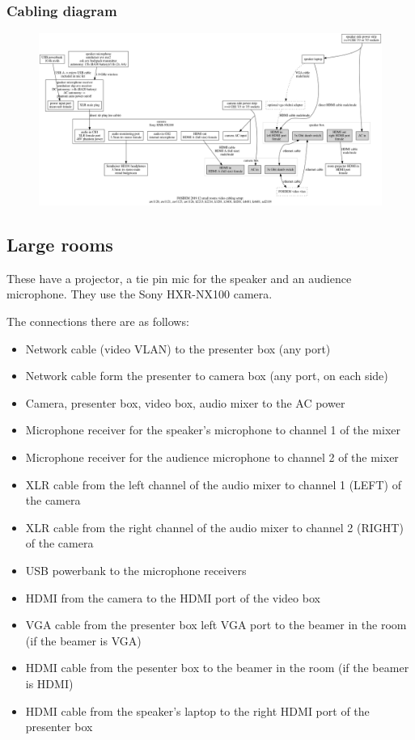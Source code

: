 \documentclass{article}
\begin{document}
\subsubsection{Cabling diagram}
\begin{figure}[H]
  \begin{sideways}
  \centering
  \includegraphics[width = 200mm]{../../graph/cabling_small_rooms.png}
  \end{sideways}
\end{figure}

\subsection{Large rooms}
These have a projector, a tie pin mic for the speaker and an audience microphone. They use the Sony HXR-NX100 camera. 

The connections there are as follows:

\begin{itemize}
  \item Network cable (video VLAN) to the presenter box (any port)
  \item Network cable form the presenter to camera box (any port, on each side)
  \item Camera, presenter box, video box, audio mixer to the AC power
  \item Microphone receiver for the speaker's microphone to channel 1 of the mixer
  \item Microphone receiver for the audience microphone to channel 2 of the mixer
  \item XLR cable from the left channel of the audio mixer to channel 1 (LEFT) of the camera
  \item XLR cable from the right channel of the audio mixer to channel 2 (RIGHT) of the camera
  \item USB powerbank to the microphone receivers
  \item HDMI from the camera to the HDMI port of the video box
  \item VGA cable from the presenter box left VGA port to the beamer in the room (if the beamer is VGA)
  \item HDMI cable from the pesenter box to the beamer in the room (if the beamer is HDMI)
  \item HDMI cable from the speaker's laptop to the right HDMI port of the presenter box
\end{itemize}
\end{document}
